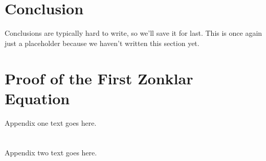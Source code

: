 \documentclass[a4paper, 10pt, american]{article}
\begin{document}
\section{Conclusion}
\label{sec:conclusion}

Conclusions are typically hard to write, so we'll save it for last. This is
once again just a placeholder because we haven't written this section yet.

\lipsum[1]

\clearpage %




\appendices
\section{Proof of the First Zonklar Equation}
Appendix one text goes here.

\section{}
Appendix two text goes here.
\end{document}
